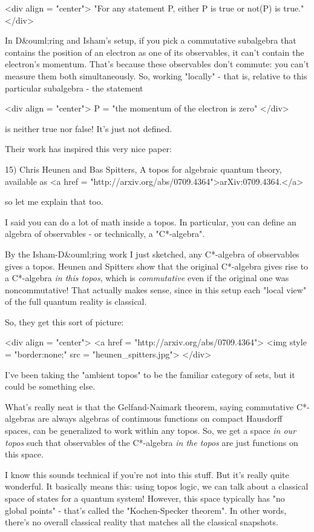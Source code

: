 <div align = "center">
"For any statement P, either P is true or not(P) is true."
</div>

In D&ouml;ring and Isham's setup, if you pick a commutative subalgebra 
that contains the position of an electron as one of its observables,
it can't contain the electron's momentum.  That's because these
observables don't commute: you can't measure them both simultaneously.
So, working "locally" - that is, relative to this particular 
subalgebra - the statement

<div align = "center">
P = "the momentum of the electron is zero"
</div>

is neither true nor false!  It's just not defined.

Their work has inspired this very nice paper:

15) Chris Heunen and Bas Spitters, A topos for algebraic quantum
theory, available as <a href = "http://arxiv.org/abs/0709.4364">arXiv:0709.4364.</a>

so let me explain that too.

I said you can do a lot of math inside a topos.  In particular, 
you can define an algebra of observables - or technically, a
"C*-algebra".

By the Isham-D&ouml;ring work I just sketched, any C*-algebra of 
observables gives a topos.  Heunen and Spitters show that 
the original C*-algebra gives rise to a
C*-algebra \emph{in this topos},
which is \emph{commutative} even if the original one was 
noncommutative!  That actually makes sense, since in this setup each 
"local view" of the full quantum reality is classical.  

So, they get this sort of picture:

<div align = "center">
<a href = "http://arxiv.org/abs/0709.4364">
<img style = "border:none;" src = "heunen_spitters.jpg">
</div>

I've been taking the "ambient topos" to be the familiar category
of sets, but it could be something else.  

What's 
really neat is that the Gelfand-Naimark theorem, saying commutative 
C*-algebras are always algebras of continuous functions on compact
Hausdorff spaces, can be generalized to work within any topos.
So, we get a space \emph{in our topos} such that observables of the 
C*-algebra \emph{in the topos} are just functions on this space.  

I know this sounds technical if you're not into this stuff.  But
it's really quite wonderful.  It basically means this: using topos 
logic, we can talk about a classical space of states for a quantum 
system!  However, this space typically has "no global points"
- that's called the "Kochen-Specker theorem".  In 
other words, there's no overall classical reality that matches all 
the classical snapshots.  

